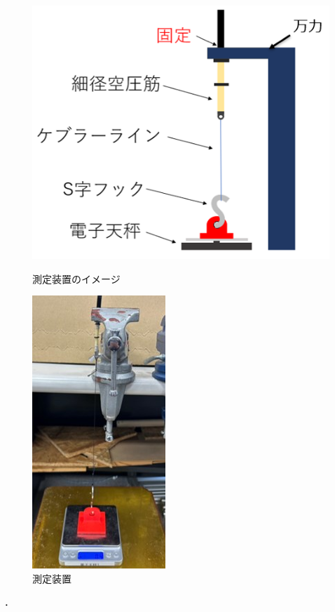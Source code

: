 \begin{figure}[h]
  \begin{minipage}[b]{0.49\columnwidth}
    \vspace{4mm}
    \centering
    \includegraphics[scale=0.5]{pic/souti.PNG}
  
    \caption{測定装置のイメージ}
    \label{fig:souti}
  \end{minipage}
  \begin{minipage}[b]{0.49\columnwidth}
    \vspace{8mm}
    \centering
    \includegraphics[scale=0.8]{pic/new.jpg}
    \caption{測定装置}
    \label{fig:souti2}
  \end{minipage}
\end{figure}．
